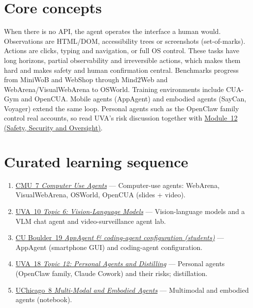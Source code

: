 \documentclass[10pt,oneside]{report}
\begin{document}
\section{Core concepts}
When there is no API, the agent operates the interface a human would. Observations are HTML/DOM, accessibility trees or screenshots (set-of-marks). Actions are clicks, typing and navigation, or full OS control. These tasks have long horizons, partial observability and irreversible actions, which makes them hard and makes safety and human confirmation central.
Benchmarks progress from MiniWoB and WebShop through Mind2Web and WebArena/VisualWebArena to OSWorld. Training environments include CUA-Gym and OpenCUA. Mobile agents (AppAgent) and embodied agents (SayCan, Voyager) extend the same loop. Personal agents such as the OpenClaw family control real accounts, so read UVA's risk discussion together with \hyperlink{mod-SAFE}{Module~12 (Safety, Security and Oversight)}.
\section{Curated learning sequence}
\begin{enumerate}
\item \hyperlink{lec-CMU-7}{CMU~7 \emph{Computer Use Agents}} --- Computer-use agents: WebArena, VisualWebArena, OSWorld, OpenCUA (slides + video).
\item \hyperlink{lec-UVA-10}{UVA~10 \emph{Topic 6: Vision-Language Models}} --- Vision-language models and a VLM chat agent and video-surveillance agent lab.
\item \hyperlink{lec-CU-19}{CU Boulder~19 \emph{AppAgent \& coding-agent configuration (students)}} --- AppAgent (smartphone GUI) and coding-agent configuration.
\item \hyperlink{lec-UVA-18}{UVA~18 \emph{Topic 12: Personal Agents and Distilling}} --- Personal agents (OpenClaw family, Claude Cowork) and their risks; distillation.
\item \hyperlink{lec-UCHI-8}{UChicago~8 \emph{Multi-Modal and Embodied Agents}} --- Multimodal and embodied agents (notebook).
\end{enumerate}
\end{document}
